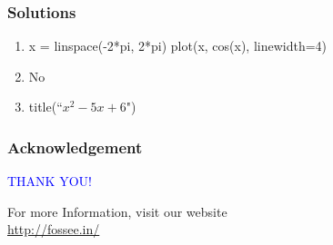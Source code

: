 \documentclass[presentation]{beamer}
\begin{document}
\begin{frame}
\frametitle{Solutions}
\label{sec-12}


\begin{enumerate}
\item x = linspace(-2*pi, 2*pi)
     plot(x, cos(x), linewidth=4)
\item No
\item title(``$x^2-5x+6$")
\end{enumerate}
\end{frame}
\begin{frame}
\frametitle{Acknowledgement}
\label{sec-13}

  \begin{block}{}
  \begin{center}
  \textcolor{blue}{\Large THANK YOU!} 
  \end{center}
  \end{block}
\begin{block}{}
  \begin{center}
    For more Information, visit our website\\
    \url{http://fossee.in/}
  \end{center}  
  \end{block}
\end{frame}
\end{document}
